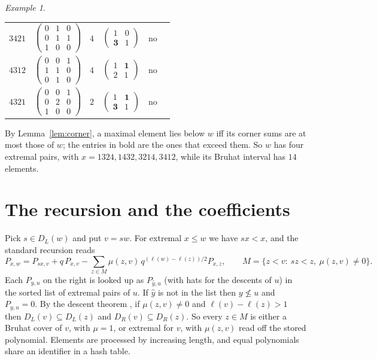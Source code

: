 \documentclass[11pt]{amsart}
\theoremstyle{definition}
\theoremstyle{remark}
\newtheorem{exa}{Example}[section]
\begin{document}
\begin{exa}
\begin{center}
\begin{tabular}{cccccc}
$3421$ & $\left(\begin{smallmatrix}0&1&0\\0&1&1\\1&0&0\end{smallmatrix}\right)$ & $4$ & $\left(\begin{smallmatrix}1&0\\\mathbf{3}&1\end{smallmatrix}\right)$ & no\\
$4312$ & $\left(\begin{smallmatrix}0&0&1\\1&1&0\\0&1&0\end{smallmatrix}\right)$ & $4$ & $\left(\begin{smallmatrix}1&\mathbf{1}\\2&1\end{smallmatrix}\right)$ & no\\
$4321$ & $\left(\begin{smallmatrix}0&0&1\\0&2&0\\1&0&0\end{smallmatrix}\right)$ & $2$ & $\left(\begin{smallmatrix}1&\mathbf{1}\\\mathbf{3}&1\end{smallmatrix}\right)$ & no\\
\bottomrule
\end{tabular}
\end{center}
By Lemma~\ref{lem:corner}, a maximal element lies below $w$ iff its corner sums are at most those of $w$; the entries in bold are the ones that exceed them. So $w$ has four extremal pairs, with $x=1324,1432,3214,3412$, while its Bruhat interval has $14$ elements.
\end{exa}

\section{The recursion and the coefficients}\label{sec:recursion}

Pick $s\in D_L(w)$ and put $v=sw$. For extremal $x\le w$ we have $sx<x$, and the standard recursion \cite{KL} reads
\begin{equation}\label{eq:rec}
P_{x,w}=P_{sx,v}+q\,P_{x,v}-\sum_{z\in M}\mu(z,v)\,q^{(\ell(w)-\ell(z))/2}P_{x,z},\qquad M=\{z<v:\ sz<z,\ \mu(z,v)\ne0\}.
\end{equation}
Each $P_{y,u}$ on the right is looked up as $P_{\hat y,u}$ (with hats for the descents of $u$) in the sorted list of extremal pairs of $u$. If $\hat y$ is not in the list then $y\not\le u$ and $P_{y,u}=0$. By the descent theorem \cite[(2.3.e)]{KL}, if $\mu(z,v)\ne0$ and $\ell(v)-\ell(z)>1$ then $D_L(v)\subseteq D_L(z)$ and $D_R(v)\subseteq D_R(z)$. So every $z\in M$ is either a Bruhat cover of $v$, with $\mu=1$, or extremal for $v$, with $\mu(z,v)$ read off the stored polynomial. Elements are processed by increasing length, and equal polynomials share an identifier in a hash table.
\end{document}
